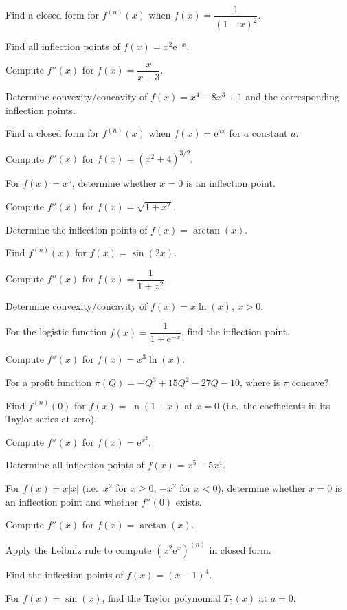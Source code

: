 \begin{problems}
  \item Find a closed form for $f^{(n)}(x)$ when $f(x)=\dfrac{1}{(1-x)^{2}}$.
  \item Find all inflection points of $f(x)=x^{2}\mathrm{e}^{-x}$.
  \item Compute $f''(x)$ for $f(x)=\dfrac{x}{x-3}$.
  \item Determine convexity/concavity of $f(x)=x^{4}-8x^{3}+1$ and the
        corresponding inflection points.
  \item Find a closed form for $f^{(n)}(x)$ when $f(x)=\mathrm{e}^{ax}$ for
        a constant $a$.
  \item Compute $f''(x)$ for $f(x)=(x^{2}+4)^{3/2}$.
  \item For $f(x)=x^{5}$, determine whether $x=0$ is an inflection point.
  \item Compute $f''(x)$ for $f(x)=\sqrt{1+x^{2}}$.
  \item Determine the inflection points of $f(x)=\arctan(x)$.
  \item Find $f^{(n)}(x)$ for $f(x)=\sin(2x)$.
  \item Compute $f''(x)$ for $f(x)=\dfrac{1}{1+x^{2}}$.
  \item Determine convexity/concavity of $f(x)=x\ln(x)$, $x>0$.
  \item For the logistic function $f(x)=\dfrac{1}{1+\mathrm{e}^{-x}}$, find
        the inflection point.
  \item Compute $f''(x)$ for $f(x)=x^{3}\ln(x)$.
  \item For a profit function $\pi(Q)=-Q^{3}+15Q^{2}-27Q-10$, where is
        $\pi$ concave?
  \item Find $f^{(n)}(0)$ for $f(x)=\ln(1+x)$ at $x=0$ (i.e.\ the
        coefficients in its Taylor series at zero).
  \item Compute $f''(x)$ for $f(x)=\mathrm{e}^{x^{2}}$.
  \item Determine all inflection points of $f(x)=x^{5}-5x^{4}$.
  \item For $f(x)=x|x|$ (i.e.\ $x^{2}$ for $x\geq 0$, $-x^{2}$ for $x<0$),
        determine whether $x=0$ is an inflection point and whether
        $f''(0)$ exists.
  \item Compute $f''(x)$ for $f(x)=\arctan(x)$.
  \item Apply the Leibniz rule to compute $(x^{2}\mathrm{e}^{x})^{(n)}$ in
        closed form.
  \item Find the inflection points of $f(x)=(x-1)^{4}$.
  \item For $f(x)=\sin(x)$, find the Taylor polynomial $T_{5}(x)$ at $a=0$.

\end{problems}
